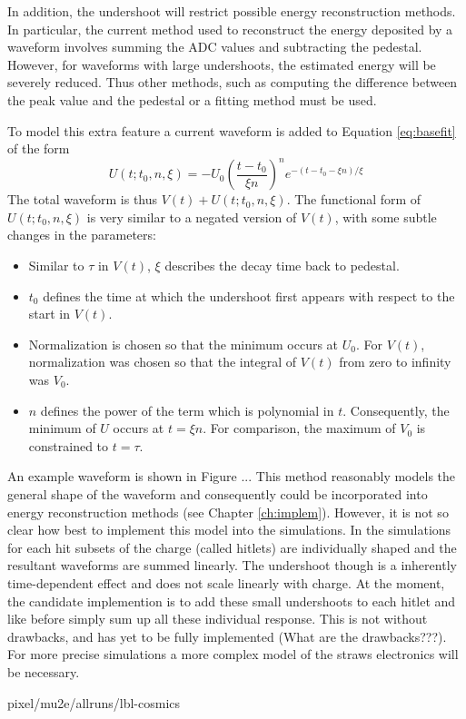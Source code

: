 In addition, the undershoot will restrict possible energy reconstruction methods. In particular, the current method used to reconstruct the energy deposited by a waveform involves summing the ADC values and subtracting the pedestal. However, for waveforms with large undershoots, the estimated energy will be severely reduced. Thus other methods, such as computing the difference between the peak value and the pedestal or a fitting method must be used. 

To model this extra feature a current waveform is added to Equation \ref{eq:basefit} of the form 
\begin{equation}
	U(t;t_0,n,\xi) = - U_0 \left( \frac{t - t_0}{\xi n} \right)^n e^{-(t - t_0 - \xi n)/\xi }
\end{equation}
The total waveform is thus $V(t) + U(t;t_0,n,\xi)$. The functional form of $U(t;t_0,n,\xi)$ is very similar to a negated version of $V(t)$, with some subtle changes in the parameters:
\begin{itemize}
\item Similar to $\tau$ in $V(t)$, $\xi$ describes the decay time back to pedestal. 
\item $t_0$ defines the time at which the undershoot first appears with respect to the start in $V(t)$.
\item Normalization is chosen so that the minimum occurs at $U_0$. For $V(t)$, normalization was chosen so that the integral of $V(t)$ from zero to infinity was $V_0$.
\item $n$ defines the power of the term which is polynomial in $t$. Consequently, the minimum of $U$ occurs at $t = \xi n$. For comparison, the maximum of $V_0$ is constrained to $t = \tau$.
\end{itemize}


An example waveform is shown in Figure ... This method reasonably models the general shape of the waveform and consequently could be incorporated into energy reconstruction methods (see Chapter \ref{ch:implem}). However, it is not so clear how best to implement this model into the simulations. In the simulations for each hit subsets of the charge (called hitlets) are individually shaped and the resultant waveforms are summed linearly. The undershoot though is a inherently time-dependent effect and does not scale linearly with charge. At the moment, the candidate implemention is to add these small undershoots to each hitlet and like before simply sum up all these individual response. This is not without drawbacks, and has yet to be fully implemented (What are the drawbacks???). For more precise simulations a more complex model of the straws electronics will be necessary.

pixel/mu2e/allruns/lbl-cosmics


